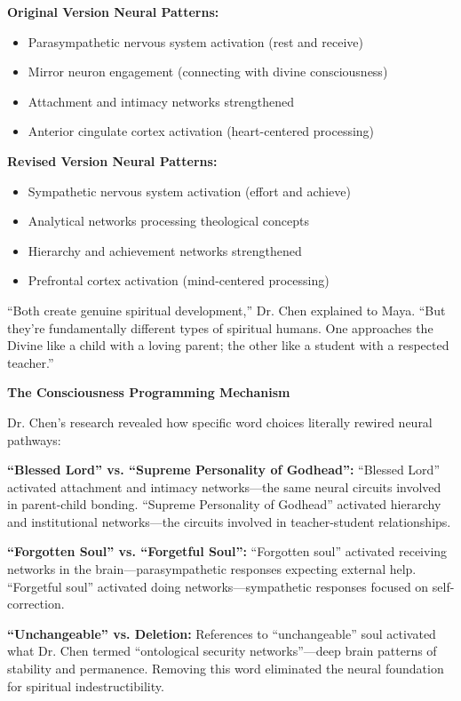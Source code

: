 \documentclass[11pt,twoside]{book}
\begin{document}
\textbf{Original Version Neural Patterns:}
\begin{itemize}
\item Parasympathetic nervous system activation (rest and receive)
\item Mirror neuron engagement (connecting with divine consciousness)
\item Attachment and intimacy networks strengthened
\item Anterior cingulate cortex activation (heart-centered processing)
\end{itemize}

\textbf{Revised Version Neural Patterns:}
\begin{itemize}
\item Sympathetic nervous system activation (effort and achieve)
\item Analytical networks processing theological concepts
\item Hierarchy and achievement networks strengthened  
\item Prefrontal cortex activation (mind-centered processing)
\end{itemize}

``Both create genuine spiritual development,'' Dr. Chen explained to Maya. ``But they're fundamentally different types of spiritual humans. One approaches the Divine like a child with a loving parent; the other like a student with a respected teacher.''

\textbf{The Consciousness Programming Mechanism}

Dr. Chen's research revealed how specific word choices literally rewired neural pathways:

\textbf{``Blessed Lord'' vs. ``Supreme Personality of Godhead'':}
``Blessed Lord'' activated attachment and intimacy networks—the same neural circuits involved in parent-child bonding. ``Supreme Personality of Godhead'' activated hierarchy and institutional networks—the circuits involved in teacher-student relationships.

\textbf{``Forgotten Soul'' vs. ``Forgetful Soul'':}
``Forgotten soul'' activated receiving networks in the brain—parasympathetic responses expecting external help. ``Forgetful soul'' activated doing networks—sympathetic responses focused on self-correction.

\textbf{``Unchangeable'' vs. Deletion:}
References to ``unchangeable'' soul activated what Dr. Chen termed ``ontological security networks''—deep brain patterns of stability and permanence. Removing this word eliminated the neural foundation for spiritual indestructibility.
\end{document}
